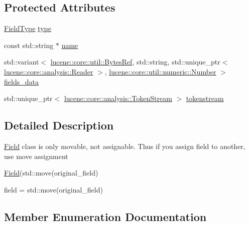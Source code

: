 \subsection*{Protected Attributes}
\begin{DoxyCompactItemize}
\item 
\mbox{\hyperlink{classlucene_1_1core_1_1document_1_1FieldType}{Field\+Type}} \mbox{\hyperlink{classlucene_1_1core_1_1document_1_1Field_a7d5849d933ebde73422710069643ccff}{type}}
\item 
const std\+::string $\ast$ \mbox{\hyperlink{classlucene_1_1core_1_1document_1_1Field_a52f673f3b3abb14b180f5159f4726537}{name}}
\item 
std\+::variant$<$ \mbox{\hyperlink{classlucene_1_1core_1_1util_1_1BytesRef}{lucene\+::core\+::util\+::\+Bytes\+Ref}}, std\+::string, std\+::unique\+\_\+ptr$<$ \mbox{\hyperlink{classlucene_1_1core_1_1analysis_1_1Reader}{lucene\+::core\+::analysis\+::\+Reader}} $>$, \mbox{\hyperlink{classlucene_1_1core_1_1util_1_1numeric_1_1Number}{lucene\+::core\+::util\+::numeric\+::\+Number}} $>$ \mbox{\hyperlink{classlucene_1_1core_1_1document_1_1Field_a2ae4ce107a1c3f4ea56f9ab812e94153}{fields\+\_\+data}}
\item 
std\+::unique\+\_\+ptr$<$ \mbox{\hyperlink{classlucene_1_1core_1_1analysis_1_1TokenStream}{lucene\+::core\+::analysis\+::\+Token\+Stream}} $>$ \mbox{\hyperlink{classlucene_1_1core_1_1document_1_1Field_a9ae72843cbdd8524362f65ee9f2c7355}{tokenstream}}
\end{DoxyCompactItemize}


\subsection{Detailed Description}
\mbox{\hyperlink{classlucene_1_1core_1_1document_1_1Field}{Field}} class is only movable, not assignable. Thus if you assign field to another, use move assignment
\begin{DoxyEnumerate}
\item \mbox{\hyperlink{classlucene_1_1core_1_1document_1_1Field}{Field}}(std\+::move(original\+\_\+field)
\item field = std\+::move(original\+\_\+field) 
\end{DoxyEnumerate}

\subsection{Member Enumeration Documentation}
\mbox{\label{classlucene_1_1core_1_1document_1_1Field_a7d5d79f0c56d3548ab8d46d0e7dae35d}} 
